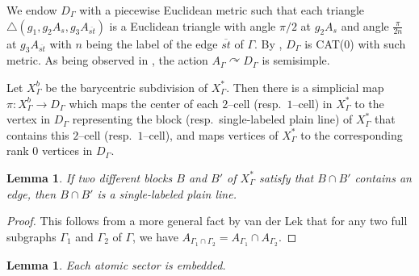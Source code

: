 \documentclass[11pt]{amsart}
\newtheorem{lemma}[theorem]{Lemma}
\theoremstyle{definition}
\newcommand{\act}{\curvearrowright}
\newcommand{\Xa}{X^{\ast}}
\begin{document}
We endow $D_\Gamma$ with a piecewise Euclidean metric such that each triangle $\triangle(g_1,g_2A_s,g_3A_{\overline{st}})$ is a Euclidean triangle with angle $\pi/2$ at $g_2A_s$ and angle $\frac{\pi}{2n}$ at $g_3A_{\overline{st}}$ with $n$ being the label of the edge $\overline{st}$ of $\Gamma$. By \cite[Proposition 4.4.5]{CharneyDavis}, $D_\Gamma$ is CAT(0) with such metric. As being observed in \cite[Lemma 6]{MR2174269}, the action $A_\Gamma\act D_\Gamma$ is semisimple.

Let $X^b_\Gamma$ be the barycentric subdivision of $\Xa_\Gamma$. Then there is a simplicial map $\pi\colon X^b_\Gamma\to D_\Gamma$ which maps the center of each $2$--cell (resp.\ $1$--cell) in $\Xa_\Gamma$ to the vertex in $D_\Gamma$ representing the block (resp.\ single-labeled plain line) of $\Xa_\Gamma$ that contains this $2$--cell (resp.\ $1$--cell), and maps vertices of $\Xa_\Gamma$ to the corresponding rank $0$ vertices in $D_\Gamma$.


\begin{lemma}
	\label{lem:intersetion of blocks}
If two different blocks $B$ and $B'$ of $\Xa_\Gamma$ satisfy that $B\cap B'$ contains an edge, then $B\cap B'$ is a single-labeled plain line.
\end{lemma}

\begin{proof}
This follows from a more general fact by van der Lek \cite{lek} that for any two full subgraphs $\Gamma_1$ and $\Gamma_2$ of $\Gamma$, we have $A_{\Gamma_1\cap\Gamma_2}=A_{\Gamma_1}\cap A_{\Gamma_2}$.
\end{proof}

\begin{lemma}
	\label{lem:atomic embedding}
Each atomic sector is embedded.
\end{lemma}
\end{document}
